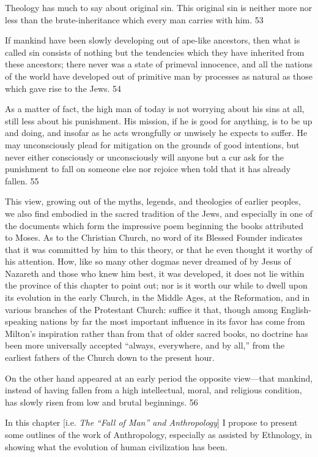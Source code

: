 Theology has much to say about original sin. This original sin is neither more nor less than
the brute-inheritance which every man carries with him. 53

If mankind have been slowly developing out of ape-like ancestors, then what is called sin
consists of nothing but the tendencies which they have inherited from these ancestors; there
never was a state of primeval innocence, and all the nations of the world have developed out
of primitive man by processes as natural as those which gave rise to the Jews. 54

As a matter of fact, the high man of today is not worrying about his sins at all, still less about
his punishment. His mission, if he is good for anything, is to be up and doing, and insofar as
he acts wrongfully or unwisely he expects to suffer. He may unconsciously plead for
mitigation on the grounds of good intentions, but never either consciously or unconsciously
will anyone but a cur ask for the punishment to fall on someone else nor rejoice when told
that it has already fallen. 55

This view, growing out of the myths, legends, and theologies of earlier peoples, we also find
embodied in the sacred tradition of the Jews, and especially in one of the documents which
form the impressive poem beginning the books attributed to Moses. As to the Christian
Church, no word of its Blessed Founder indicates that it was committed by him to this theory,
or that he even thought it worthy of his attention. How, like so many other dogmas never
dreamed of by Jesus of Nazareth and those who knew him best, it was developed, it does not
lie within the province of this chapter to point out; nor is it worth our while to dwell upon its
evolution in the early Church, in the Middle Ages, at the Reformation, and in various
branches of the Protestant Church: suffice it that, though among English-speaking nations by
far the most important influence in its favor has come from Milton's inspiration rather than
from that of older sacred books, no doctrine has been more universally accepted ``always,
everywhere, and by all,'' from the earliest fathers of the Church down to the present hour.

On the other hand appeared at an early period the opposite view—that mankind, instead of
having fallen from a high intellectual, moral, and religious condition, has slowly risen from
low and brutal beginnings. 56

In this chapter [i.e. \textit{The ``Fall of Man'' and Anthropology}] I propose to present some outlines
of the work of Anthropology, especially as assisted by Ethnology, in showing what the
evolution of human civilization has been.

